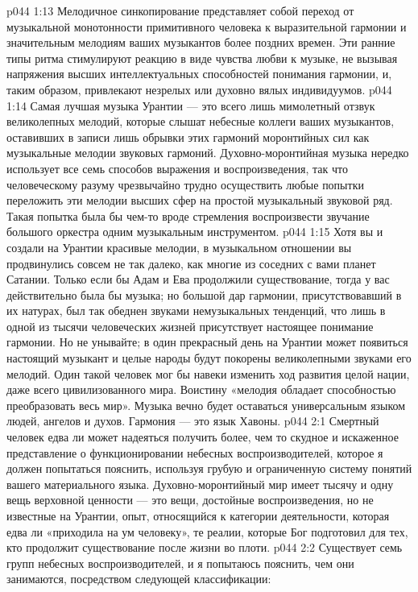 \vs p044 1:13 Мелодичное синкопирование представляет собой переход от музыкальной монотонности примитивного человека к выразительной гармонии и значительным мелодиям ваших музыкантов более поздних времен. Эти ранние типы ритма стимулируют реакцию в виде чувства любви к музыке, не вызывая напряжения высших интеллектуальных способностей понимания гармонии, и, таким образом, привлекают незрелых или духовно вялых индивидуумов.
\vs p044 1:14 \pc Самая лучшая музыка Урантии --- это всего лишь мимолетный отзвук великолепных мелодий, которые слышат небесные коллеги ваших музыкантов, оставивших в записи лишь обрывки этих гармоний моронтийных сил как музыкальные мелодии звуковых гармоний. Духовно\hyp{}моронтийная музыка нередко использует все семь способов выражения и воспроизведения, так что человеческому разуму чрезвычайно трудно осуществить любые попытки переложить эти мелодии высших сфер на простой музыкальный звуковой ряд. Такая попытка была бы чем\hyp{}то вроде стремления воспроизвести звучание большого оркестра одним музыкальным инструментом.
\vs p044 1:15 Хотя вы и создали на Урантии красивые мелодии, в музыкальном отношении вы продвинулись совсем не так далеко, как многие из соседних с вами планет Сатании. Только если бы Адам и Ева продолжили существование, тогда у вас действительно была бы музыка; но большой дар гармонии, присутствовавший в их натурах, был так обеднен звуками немузыкальных тенденций, что лишь в одной из тысячи человеческих жизней присутствует настоящее понимание гармонии. Но не унывайте; в один прекрасный день на Урантии может появиться настоящий музыкант и целые народы будут покорены великолепными звуками его мелодий. Один такой человек мог бы навеки изменить ход развития целой нации, даже всего цивилизованного мира. Воистину «мелодия обладает способностью преобразовать весь мир». Музыка вечно будет оставаться универсальным языком людей, ангелов и духов. Гармония --- это язык Хавоны.
\vs p044 2:1 Смертный человек едва ли может надеяться получить более, чем то скудное и искаженное представление о функционировании небесных воспроизводителей, которое я должен попытаться пояснить, используя грубую и ограниченную систему понятий вашего материального языка. Духовно\hyp{}моронтийный мир имеет тысячу и одну вещь верховной ценности --- это вещи, достойные воспроизведения, но не известные на Урантии, опыт, относящийся к категории деятельности, которая едва ли «приходила на ум человеку», те реалии, которые Бог подготовил для тех, кто продолжит существование после жизни во плоти.
\vs p044 2:2 \pc Существует семь групп небесных воспроизводителей, и я попытаюсь пояснить, чем они занимаются, посредством следующей классификации:
